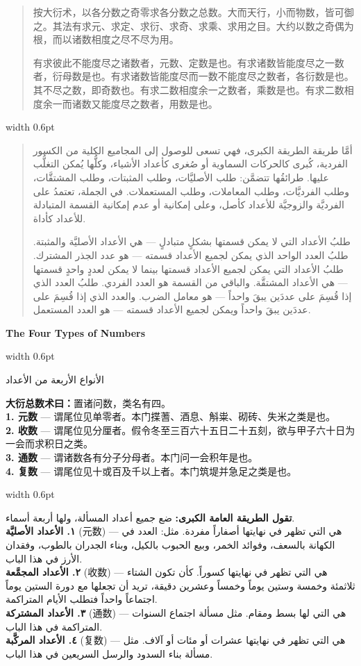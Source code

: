 \documentclass[11pt,a4paper]{article}
\newlength{\cnwidth}
\newlength{\arwidth}
\newcommand{\paralleltext}[2]{%
  \par\medskip\noindent
  \begin{minipage}[t]{\cnwidth}%
    \small #1%
  \end{minipage}%
  \hfill\textcolor{colrule}{\vrule width 0.6pt}\hfill
  \begin{minipage}[t]{\arwidth}%
    \small\arabicfont\beginR #2\endR%
  \end{minipage}%
  \par\medskip
}
\newcommand{\parallelsubsection}[2]{%
  \par\medskip\noindent
  \begin{minipage}[t]{\cnwidth}%
    \large\bfseries\color{sectioncolor} #1%
  \end{minipage}%
  \hfill\textcolor{colrule}{\vrule width 0.6pt}\hfill
  \begin{minipage}[t]{\arwidth}%
    \large\arabicfontbf\color{sectioncolor}\beginR #2\endR%
  \end{minipage}%
  \par\smallskip
}
\newenvironment{cnquote}{\begin{quote}\color{prefacecolor}}{\end{quote}}
\begin{document}
\paralleltext{%
\begin{cnquote}
按大衍术，以各分数之奇零求各分数之总数。大而天行，小而物数，皆可御之。其法有求元、求定、求衍、求奇、求乘、求用之目。大约以数之奇偶为根，而以诸数相度之尽不尽为用。

有求彼此不能度尽之诸数者，元数、定数是也。有求诸数皆能度尽之一数者，衍母数是也。有求诸数皆能度尽而一数不能度尽之数者，各衍数是也。其不尽之数，即奇数也。有求二数相度余一之数者，乘数是也。有求二数相度余一而诸数又能度尽之数者，用数是也。
\end{cnquote}%
}{%
\begin{quote}
أمَّا طريقة الطريقة الكبرى، فهي تسعى للوصول إلى المجاميع الكلية من الكسور الفردية، كُبرى كالحركات السماوية أو صُغرى كأعداد الأشياء، وكلُّها يُمكن التغلُّب عليها. طرائقُها تتضمَّن: طلب الأصليَّات، وطلب المثبتات، وطلب المشتقَّات، وطلب الفرديَّات، وطلب المعاملات، وطلب المستعملات. في الجملة، تعتمدُ على الفرديَّة والزوجيَّة للأعداد كأصل، وعلى إمكانية أو عدم إمكانية القسمة المتبادلة للأعداد كأداة.

طلبُ الأعداد التي لا يمكن قسمتها بشكلٍ متبادلٍ --- هي الأعداد الأصليَّة والمثبتة. طلبُ العدد الواحد الذي يمكن لجميع الأعداد قسمته --- هو عدد الجذر المشترك. طلبُ الأعداد التي يمكن لجميع الأعداد قسمتها بينما لا يمكن لعددٍ واحدٍ قسمتها --- هي الأعداد المشتقَّة. والباقي من القسمة هو العدد الفردي. طلبُ العدد الذي إذا قُسِمَ على عددَين يبقَ واحداً --- هو معامل الضرب. والعدد الذي إذا قُسِمَ على عددَين يبقَ واحداً ويمكن لجميع الأعداد قسمته --- هو العدد المستعمل.
\end{quote}
}

\parallelsubsection{The Four Types of Numbers}{الأنواع الأربعة من الأعداد}

\paralleltext{%
\textbf{大衍总数术曰：}置诸问数，类名有四。\\
\textbf{1. 元数} --- 谓尾位见单零者。本门揲蓍、酒息、斛粜、砌砖、失米之类是也。\\
\textbf{2. 收数} --- 谓尾位见分厘者。假令冬至三百六十五日二十五刻，欲与甲子六十日为一会而求积日之类。\\
\textbf{3. 通数} --- 谓诸数各有分子分母者。本门问一会积年是也。\\
\textbf{4. 复数} --- 谓尾位见十或百及千以上者。本门筑堤并急足之类是也。%
}{%
\textbf{تقول الطريقة العامة الكبرى:} ضع جميع أعداد المسألة، ولها أربعة أسماء.\\
\textbf{١. الأعداد الأصليَّة} (元数) --- هي التي تظهر في نهايتها أصفاراً مفردة. مثل: العدد في الكهانة بالسعف، وفوائد الخمر، وبيع الحبوب بالكيل، وبناء الجدران بالطوب، وفقدان الأرز في هذا الباب.\\
\textbf{٢. الأعداد المجمَّعة} (收数) --- هي التي تظهر في نهايتها كسوراً. كأن تكون الشتاء ثلاثمئة وخمسة وستين يوماً وخمساً وعشرين دقيقة، تريد أن تجعلها مع دورة الستين يوماً اجتماعاً واحداً فتطلب الأيام المتراكمة.\\
\textbf{٣. الأعداد المشتركة} (通数) --- هي التي لها بسط ومقام. مثل مسألة اجتماع السنوات المتراكمة في هذا الباب.\\
\textbf{٤. الأعداد المركَّبة} (复数) --- هي التي تظهر في نهايتها عشرات أو مئات أو آلاف. مثل مسألة بناء السدود والرسل السريعين في هذا الباب.
}
\end{document}
